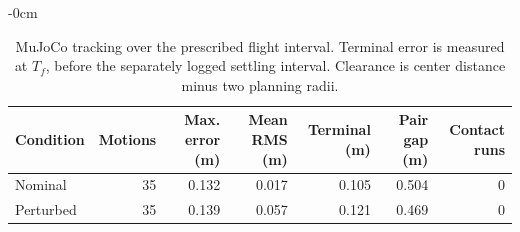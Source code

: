 \begin{table}[htbp]
\begin{adjustwidth}{-\extralength}{0cm}
\caption{MuJoCo tracking over the prescribed flight interval. Terminal error is measured at $T_f$, before the separately logged settling interval. Clearance is center distance minus two planning radii.\label{tab:tracking-new}}
\centering\small
\begin{tabular}{lrrrrrr}\toprule
Condition & Motions & Max. error (m) & Mean RMS (m) & Terminal (m) & Pair gap (m) & Contact runs\\\midrule
Nominal & 35 & 0.132 & 0.017 & 0.105 & 0.504 & 0\\
Perturbed & 35 & 0.139 & 0.057 & 0.121 & 0.469 & 0\\
\bottomrule\end{tabular}
\end{adjustwidth}
\end{table}
